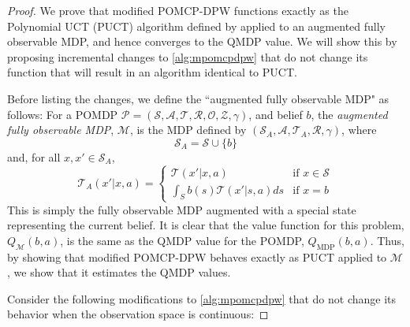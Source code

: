 \begin{proof}
    We prove that modified POMCP-DPW functions exactly as the Polynomial UCT (PUCT) algorithm defined by \citet{auger2013continuous} applied to an augmented fully observable MDP, and hence converges to the QMDP value.
    We will show this by proposing incremental changes to \cref{alg:mpomcpdpw} that do not change its function that will result in an algorithm identical to PUCT.

    Before listing the changes, we define the ``augmented fully observable MDP" as follows: For a POMDP $\mathcal{P} = (\mathcal{S}, \mathcal{A}, \mathcal{T}, \mathcal{R}, \mathcal{O}, \mathcal{Z}, \gamma)$, and belief $b$, the \emph{augmented fully observable MDP}, $\mathcal{M}$, is the MDP defined by $(\mathcal{S}_A, \mathcal{A}, \mathcal{T}_A, \mathcal{R}, \gamma)$, where 
    \begin{equation}
        \mathcal{S}_A = \mathcal{S} \cup \{b\}
    \end{equation}
    and, for all $x, x' \in \mathcal{S}_A$,
    \begin{equation}
        \mathcal{T}_A (x'|x, a) = \begin{cases}
                \mathcal{T} (x' | x, a) & \text{if } x \in \mathcal{S} \\
                \int_S b(s) \mathcal{T} (x' | s, a) ds & \text{if } x = b
        \end{cases}
    \end{equation}
    This is simply the fully observable MDP augmented with a special state representing the current belief.
    It is clear that the value function for this problem, $Q_\mathcal{M}(b, a)$, is the same as the QMDP value for the POMDP, $Q_\text{MDP}(b,a)$.
    Thus, by showing that modified POMCP-DPW behaves exactly as PUCT applied to $\mathcal{M}$, we show that it estimates the QMDP values.


    Consider the following modifications to \cref{alg:mpomcpdpw} that do not change its behavior when the observation space is continuous:


\end{proof}
